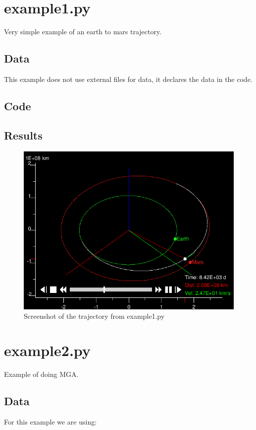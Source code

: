 \documentclass[a4paper,11pt]{article}
\begin{document}
\appendix

\newpage
\section{example1.py}\label{app:example1}
Very simple example of an earth to mars trajectory.
\subsection{Data}
This example does not use external files for data, it declares the data in the code.
\subsection{Code}

\subsection{Results}
\begin{figure}[H]
\centering
\includegraphics[width=1\textwidth]{img/example1}
\caption{Screenshot of the trajectory from example1.py}
\label{img:example1}
\end{figure}


\newpage
\section{example2.py}
Example of doing \gls{MGA}.
\subsection{Data}
For this example we are using:
\end{document}
